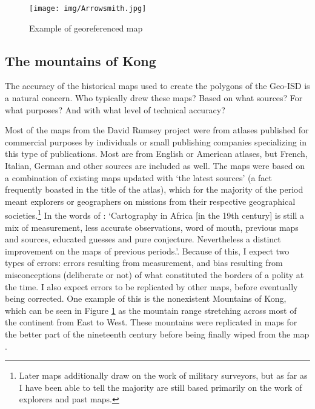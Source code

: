 \documentclass[12pt]{article}
\begin{document}

\begin{figure}[h!tpb]
	\centering
	\texttt{[image: img/Arrowsmith.jpg]}
	\caption{Example of georeferenced map}%
	\label{Arrowsmith}
\end{figure}


\subsection{The mountains of Kong} \label{The mountains of Kong}

The accuracy of the historical maps used to create the polygons of the Geo-ISD
is a natural concern. Who typically drew these maps? Based on what sources? For
what purposes? And with what level of technical accuracy? 

Most of the maps from the David Rumsey project were from atlases published
for commercial purposes by individuals or small publishing companies
specializing in this type of publications. Most are from English or American
atlases, but French, Italian, German and other sources are included as well. The
maps were based on a combination of existing maps updated with `the latest
sources' (a fact frequently boasted in the title of the atlas), which for the
majority of the period meant explorers or geographers on missions from their
respective geographical societies.\footnote{Later maps additionally draw on the
	work of military surveyors, but as far as I have been able to tell the
majority are still based primarily on the work of explorers and past maps.} In
the words of \citet[47-48]{Stone1995}: `Cartography in Africa [in the 19th
century] is still a mix of measurement, less accurate observations, word of
mouth, previous maps and sources, educated guesses and pure conjecture.
Nevertheless a distinct improvement on the maps of previous periods.'. Because
of this, I expect two types of errors: errors resulting from measurement, and
bias resulting from misconceptions (deliberate or not) of what constituted the
borders of a polity at the time. I also expect errors to be replicated by other
maps, before eventually being corrected. One example of this is the nonexistent
Mountains of Kong, which can be seen in Figure \ref{Arrowsmith} as the mountain
range stretching across most of the continent from East to West. These mountains
were replicated in maps for the better part of the nineteenth century before
being finally wiped from the map \citep{Bassett_1991}.
\end{document}
